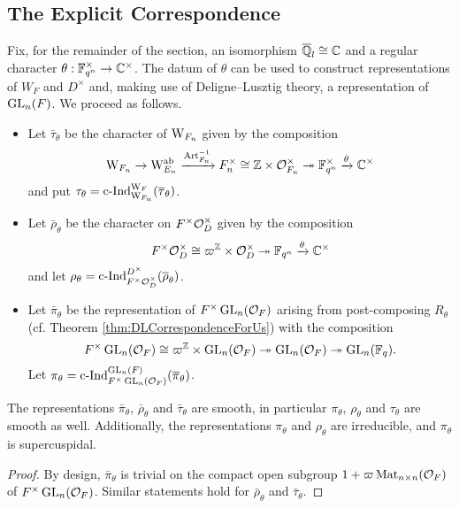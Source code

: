 \documentclass[../main.tex]{subfiles}
\begin{document}
\subsection{The Explicit Correspondence} %
\label{sub:The Explicit Correspondence}
Fix, for the remainder of the section, an isomorphism $\overline {\mathbb{Q}}_l \cong \mathbb{C}$ and
a regular character $\theta: \mathbb{F}_{q^n}^\times \to \mathbb{C}^\times$. 
The datum of $\theta$ can be used to construct representations 
of $W_F$ and $D^\times$ and, making use of Deligne--Lusztig
theory, a representation of $\operatorname{GL}_n(F)$. We proceed as follows.
\begin{itemize}
  \item Let $\bar \tau_\theta$ be the character of $\mathrm W_{F_n}$ given by 
    the composition
    \begin{equation*}
      \mathrm W_{F_n} \to \mathrm W_{E_n}^{\mathrm{ab}} \xrightarrow{\mathrm{Art}_{F_n}^{-1}} F_n^\times \cong
      \mathbb{Z} \times \mathcal{O}_{F_n}^\times \twoheadrightarrow \mathbb{F}_{q^n}^\times \xrightarrow{\theta} \mathbb{C}^\times
    \end{equation*}
  and put $\tau_\theta = \mathrm{c\text{-}Ind}_{\mathrm W_{F_n}}^{\mathrm W_F}(\overline \tau_\theta)$.
  \item Let $\bar \rho_\theta$ be the character on 
    $F^\times \mathcal{O}_D^\times$ given by the composition
    \begin{equation*}
      F^\times\mathcal{O}_D^\times \cong \varpi^{\mathbb{Z}} \times \mathcal{O}_D^\times \twoheadrightarrow 
      \mathbb{F}_{q^n} \xrightarrow{\theta} \mathbb{C}^\times
    \end{equation*}
    and let $\rho_\theta = \mathrm{c\text{-}Ind}_{F^\times \mathcal{O}_D^\times}^{D^\times}(\overline \rho_\theta)$.
  \item Let $\bar \pi_\theta$ be the representation of $F^\times \operatorname{GL}_n(\mathcal{O}_F)$
    arising from post-composing $R_\theta$ (cf. Theorem
    \ref{thm:DLCorrespondenceForUs}) with the composition
    \begin{equation*}
      F^\times \operatorname{GL}_n(\mathcal{O}_F) \cong \varpi^{\mathbb{Z}} \times \operatorname{GL}_n(\mathcal{O}_F)
      \twoheadrightarrow \operatorname{GL}_n(\mathcal{O}_F) \twoheadrightarrow \operatorname{GL}_n(\mathbb{F}_q).
    \end{equation*}
    Let $\pi_\theta = \mathrm{c\text{-}Ind}_{F^\times \operatorname{GL}_n(\mathcal{O}_F)}^{\operatorname{GL}_n(F)}(\overline \pi_\theta)$. 
\end{itemize}

\begin{lem}\label{lem:BarRepsAreSmooth}
  The representations $\bar \pi_\theta$, $\bar \rho_\theta$ and $\bar
  \tau_\theta$ are smooth, in particular
  $\pi_\theta$, $\rho_\theta$ and $\tau_\theta$ are smooth as well. Additionally, the
  representations $\pi_\theta$ and $\rho_\theta$ are irreducible, and
  $\pi_\theta$ is supercuspidal.
\begin{proof}
  By design, $\bar \pi_\theta$ is trivial on the compact open subgroup $1 +
  \varpi \operatorname{Mat}_{n \times n}(\mathcal{O}_F)$ of $F^\times \operatorname{GL}_n(\mathcal{O}_F)$. Similar
  statements hold for $\bar \rho_\theta$
  and $\bar \tau_\theta$. 
\end{proof}
\end{lem}
\end{document}
